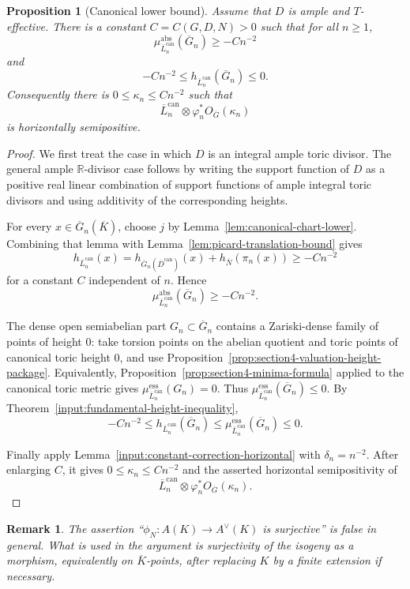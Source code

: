 \documentclass[10pt,a4paper]{amsart}
\theoremstyle{plain}
\newtheorem{proposition}[theorem]{Proposition}
\newtheorem{remark}[theorem]{Remark}
\theoremstyle{plain}
\numberwithin{equation}{section}
\providecommand{\bR}{\mathbb{R}}
\providecommand{\ol}{\overline}
\providecommand{\can}{\operatorname{can}}
\providecommand{\muess}{\mu^{\mathrm{ess}}}
\begin{document}
\begin{proposition}[Canonical lower bound]
	\label{prop:canonical-lower-bound}
	Assume that \(D\) is ample and \(T\)-effective.  There is a constant
	\(C=C(G,D,N)>0\) such that for all \(n\ge 1\),
	\[
	\mu^{\mathrm{abs}}_{\ol L_n^{\can}}(\ol G_n)\ge -C n^{-2}
	\]
	and
	\[
	-C n^{-2}\le h_{\ol L_n^{\can}}(\ol G_n)\le 0.
	\]
	Consequently there is \(0\le\kappa_n\le Cn^{-2}\) such that
	\[
	\ol L_n^{\can}\otimes\varphi_n^*O_{\ol G}(\kappa_n)
	\]
	is horizontally semipositive.
\end{proposition}

\begin{proof}
	We first treat the case in which \(D\) is an integral ample toric divisor.
	The general ample \(\bR\)-divisor case follows by writing the support function
	of \(D\) as a positive real linear combination of support functions of ample
	integral toric divisors and using additivity of the corresponding heights.
	
	For every \(x\in \overline G_n(\overline K)\), choose \(j\) by
	Lemma~\ref{lem:canonical-chart-lower}.  Combining that lemma with
	Lemma~\ref{lem:picard-translation-bound} gives
	\[
	h_{\ol L_n^{\can}}(x)
	=h_{\ol G_n(\ol D^{\can})}(x)+h_{\ol N}(\pi_n(x))
	\ge -Cn^{-2}
	\]
	for a constant \(C\) independent of \(n\).  Hence
	\[
	\mu^{\mathrm{abs}}_{\ol L_n^{\can}}(\ol G_n)\ge -Cn^{-2}.
	\]
	
	The dense open semiabelian part \(G_n\subset\overline G_n\) contains a
	Zariski-dense family of points of height \(0\): take torsion points on the
	abelian quotient and toric points of canonical toric height \(0\), and use
	Proposition~\ref{prop:section4-valuation-height-package}.  Equivalently,
	Proposition~\ref{prop:section4-minima-formula} applied to the canonical toric
	metric gives \(\muess_{\ol L_n^{\can}}(G_n)=0\).  Thus
	\(\muess_{\ol L_n^{\can}}(\overline G_n)\le0\).  By
	Theorem~\ref{input:fundamental-height-inequality},
	\[
	-Cn^{-2}
	\le
	h_{\ol L_n^{\can}}(\ol G_n)
	\le
	\mu^{\mathrm{ess}}_{\ol L_n^{\can}}(\ol G_n)
	\le0 .
	\]
	
	Finally apply Lemma~\ref{input:constant-correction-horizontal} with
	\(\delta_n=n^{-2}\).  After enlarging \(C\), it gives
	\(0\le\kappa_n\le Cn^{-2}\) and the asserted horizontal semipositivity of
	\[
	\ol L_n^{\can}\otimes\varphi_n^*O_{\ol G}(\kappa_n).
	\]
\end{proof}

\begin{remark}
	The assertion ``\(\phi_N:A(K)\to A^\vee(K)\) is surjective'' is false in
	general.  What is used in the argument is surjectivity of the isogeny as a
	morphism, equivalently on \(\ol K\)-points, after replacing \(K\) by a finite
	extension if necessary.
\end{remark}
\end{document}
